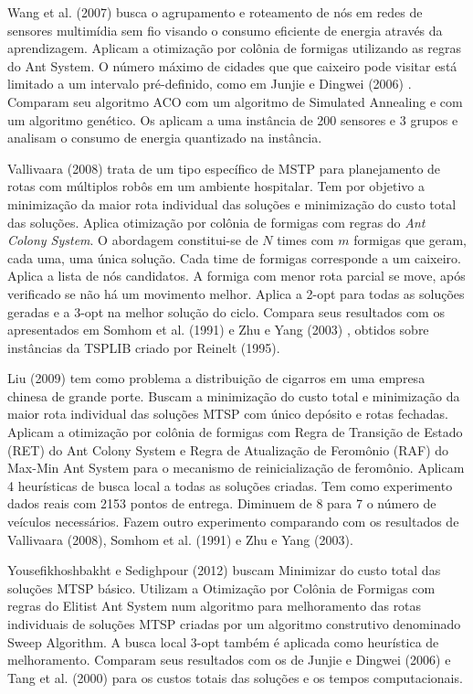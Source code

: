 Wang et al. (2007) \cite{wang2007hierarchical} busca o agrupamento e roteamento de nós em redes de sensores multimídia sem fio visando o consumo eficiente de energia através da aprendizagem. Aplicam a otimização por colônia de formigas utilizando as regras do Ant System. O número máximo de cidades que que caixeiro pode visitar está limitado a um intervalo pré-definido, como em Junjie e Dingwei (2006) \cite{junjie2006}. Comparam seu algoritmo ACO com um algoritmo de Simulated Annealing e com um algoritmo genético. Os aplicam a uma instância de 200 sensores e 3 grupos e analisam o consumo de energia quantizado na instância.

Vallivaara (2008) \cite{vallivaara2008team} trata de um tipo específico de MSTP para planejamento de rotas com múltiplos robôs em um ambiente hospitalar. Tem por objetivo a minimização da maior rota individual das soluções e minimização do custo total das soluções. Aplica otimização por colônia de formigas com regras do \textit{Ant Colony System}. O abordagem constitui-se de $N$ times com $m$ formigas que geram, cada uma, uma única solução. Cada time de formigas corresponde a um caixeiro. Aplica a lista de nós candidatos. A formiga com menor rota parcial se move, após verificado se não há um movimento melhor. Aplica a 2-opt para todas as soluções geradas e a 3-opt na melhor solução do ciclo. Compara seus resultados com os apresentados em Somhom et al. (1991) e Zhu e Yang (2003) \cite{zhu2003}, obtidos sobre instâncias da TSPLIB criado por Reinelt (1995).

Liu (2009) tem como problema a distribuição de cigarros em uma empresa chinesa de grande porte. Buscam a minimização do custo total e minimização da maior rota individual das soluções MTSP com único depósito e rotas fechadas. Aplicam a otimização por colônia de formigas com Regra de Transição de Estado (RET) do Ant Colony System e Regra de Atualização de Feromônio (RAF) do Max-Min Ant System para o mecanismo de reinicialização de feromônio. Aplicam 4 heurísticas de busca local a todas as soluções criadas. Tem como experimento dados reais com 2153 pontos de entrega. Diminuem de 8 para 7 o número de veículos necessários. Fazem outro experimento comparando com os resultados de Vallivaara (2008),  Somhom et al. (1991) e  Zhu e Yang (2003).

Yousefikhoshbakht e Sedighpour (2012) \cite{yousefikhoshbakht2012} buscam Minimizar do custo total das soluções MTSP básico. Utilizam a Otimização por Colônia de Formigas com regras do Elitist Ant System num algoritmo para melhoramento das rotas individuais de soluções MTSP criadas por um algoritmo construtivo denominado Sweep Algorithm. A busca local 3-opt também é aplicada como heurística de melhoramento. Comparam seus resultados com os de Junjie e Dingwei (2006) e Tang et al. (2000) para os custos totais das soluções e os tempos computacionais.

